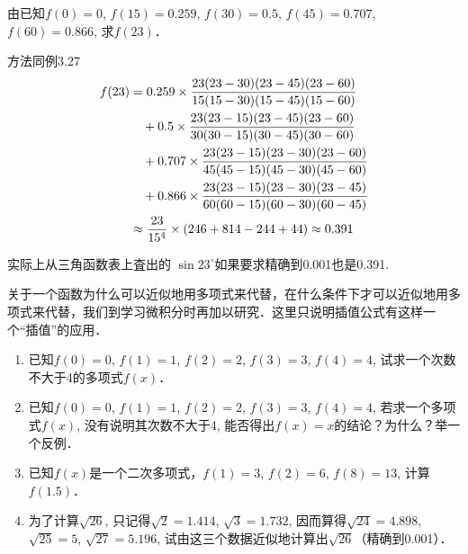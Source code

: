 \begin{solution}
    由已知$f(0)=0$, $f(15)=0. 259$, $f(30)=0. 5$, $f(45)=0. 707$, $f(60)=0. 866$, 求$f(23)$．

方法同例3.27
\[\begin{split}
    f(23)&=0. 259\times \dfrac{23 (23-30) (23-45)(23-60)}{15 (15-30) (15-45)(15-60)}\\
    &\quad +0. 5\times \dfrac{23 (23-15) (23-45)(23-60)}{30 (30-15) (30-45)(30-60)}\\
&\quad +0. 707\times \dfrac{23 (23-15) (23-30)(23-60)}{45 (45-15) (45-30)(45-60)}\\
&\quad +0.866\times \dfrac{23 (23-15) (23-30)(23-45)}{60 (60-15) (60-30)(60-45)}\\
&\approx \dfrac{23}{15^4}\times (246+814-244+44) \approx 0. 391
\end{split}\]

实际上从三角函数表上査出的 $\sin23^{\circ}$如果要求精确到0.001也是0.391.
\end{solution}

关于一个函数为什么可以近似地用多项式来代替，在什么条件下才可以近似地用多项式来代替，我们到学习微积分时再加以研究．这里只说明插值公式有这样一个“插值”的应用．

\begin{ex}
    \begin{enumerate}
    \item 已知$f(0)=0$, $f(1)=1$, $f(2)=2$, $f(3)=3$,
    $f(4)=4$, 试求一个次数不大于4的多项式$f(x)$．
    \item 已知$f(0)=0$, $f(1)=1$, $f(2)=2$, $f(3)=3$,
    $f(4)=4$, 若求一个多项式$f(x)$, 没有说明其次数不大于4, 能否得出$f(x)=x$的结论？为什么？举一个反例．
    \item 已知$f(x)$是一个二次多项式，$f(1)=3$, $f(2)=6$, $f(8)=13$, 计算$f(1. 5)$．
    \item 为了计算$\sqrt{26}$, 只记得$\sqrt{2}=1. 414$, $\sqrt{3}=1. 732$, 因而算得$\sqrt{24}=4.898$, $\sqrt{25}=5$, $\sqrt{27}=5. 196$, 试由这三个数据近似地计算出$\sqrt{26}$（精确到0.001）．
    \end{enumerate} 
    \end{ex}
    
